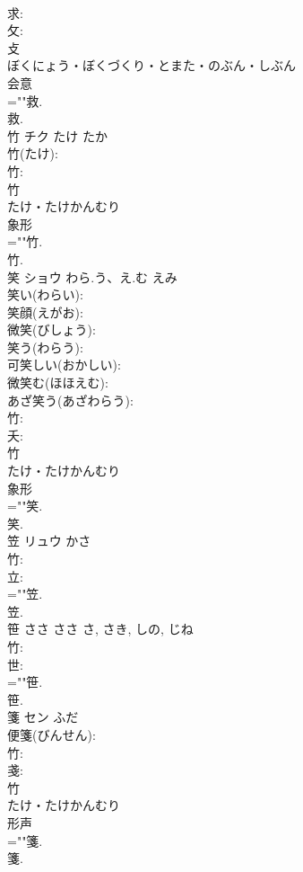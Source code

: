 \documentclass[8pt]{extreport}
\begin{document}
\begin{CJK}{UTF8}{min}
\\	求: 
\\	攵: 
\\	攴	
\\	ぼくにょう・ぼくづくり・とまた・のぶん・しぶん	
\\	会意 
\\	=""救.
\\	救.
\\	竹	チク	たけ	たか	
\\	竹(たけ): 
\\	竹: 
\\	竹	
\\	たけ・たけかんむり	
\\	象形 
\\	=""竹.
\\	竹.
\\	笑	ショウ	わら.う、え.む	えみ	
\\	笑い(わらい): 
\\	笑顔(えがお): 
\\	微笑(びしょう): 
\\	笑う(わらう): 
\\	可笑しい(おかしい): 
\\	微笑む(ほほえむ): 
\\	あざ笑う(あざわらう): 
\\	竹: 
\\	夭: 
\\	竹	
\\	たけ・たけかんむり	
\\	象形 
\\	=""笑.
\\	笑.
\\	笠	リュウ	かさ		
\\	竹: 
\\	立: 
\\	=""笠.
\\	笠.
\\	笹	ささ	ささ	さ, さき, しの, じね	
\\	竹: 
\\	世: 
\\	=""笹.
\\	笹.
\\	箋	セン	ふだ		
\\	便箋(びんせん): 
\\	竹: 
\\	戔: 
\\	竹	
\\	たけ・たけかんむり	
\\	形声 
\\	=""箋.
\\	箋.

\end{CJK}
\end{document}
